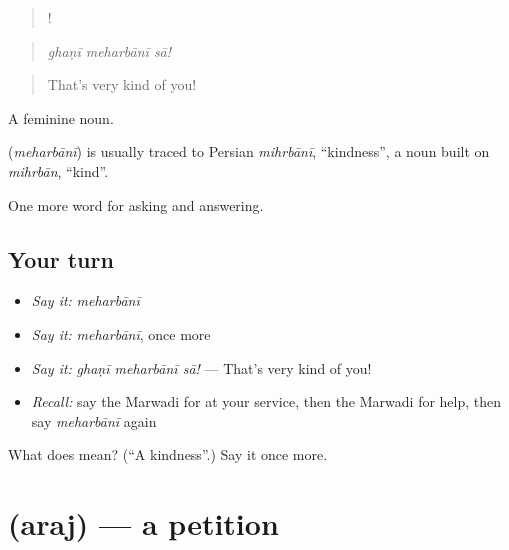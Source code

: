 \begin{quote}
  !
\end{quote}

\begin{quote}
\emph{ghaṇī meharbānī sā!}
\end{quote}

\begin{quote}
That's very kind of you!
\end{quote}

A feminine noun.

\begin{cousinweb}
\textbf{} (\emph{meharbānī}) is usually traced to Persian \emph{mihrbānī}, \textquotedblleft{}kindness\textquotedblright{}, a noun built on \emph{mihrbān}, \textquotedblleft{}kind\textquotedblright{}.
\end{cousinweb}

\begin{grammarlens}[title={What you've built}]
One more word for asking and answering.
\end{grammarlens}

\subsection*{Your turn}
\begin{itemize}
\raggedright
  \item \emph{Say it:} \emph{meharbānī}
  \item \emph{Say it:} \emph{meharbānī}, once more
  \item \emph{Say it:} \emph{ghaṇī meharbānī sā!} — That's very kind of you!
  \item \emph{Recall:} say the Marwadi for at your service, then the Marwadi for help, then say \emph{meharbānī} again
\end{itemize}

\begin{tcolorbox}[breakable,colback=teal!4,colframe=teal!35!black,title={Before you move on}]
What does  mean? (\textquotedblleft{}A kindness\textquotedblright{}.) Say it once more.
\end{tcolorbox}
\section[\texorpdfstring{\mw{अरज} (araj)}{अरज (araj)}]{ (araj) — a petition}

\label{lesson:MW-C266-araj}



